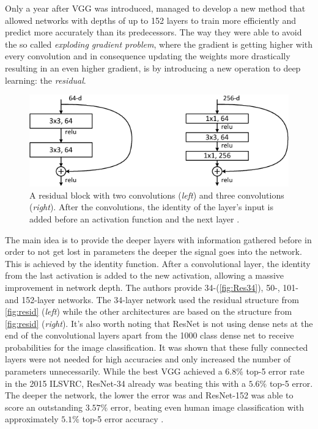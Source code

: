 Only a year after VGG was introduced, \citet{He_2016} managed to develop a new method that allowed networks with depths of up to 152 layers to train more efficiently and predict more accurately than its predecessors. The way they were able to avoid the so called \textit{exploding gradient problem}, where the gradient is getting higher with every convolution and in consequence updating the weights more drastically resulting in an even higher gradient, is by introducing a new operation to deep learning: the \textit{residual}. \\

\begin{figure}[h!]
\centering
\includegraphics[width=.667\textwidth]{images/Chapter2/6-Figure5-1.png}
\caption{A residual block with two convolutions (\textit{left}) and three convolutions (\textit{right}). After the convolutions, the identity of the layer's input is added before an activation function and the next layer \citep{He_2016}.} 
\label{fig:resid}
\end{figure}

The main idea is to provide the deeper layers with information gathered before in order to not get lost in parameters the deeper the signal goes into the network. This is achieved by the identity function. After a convolutional layer, the identity from the last activation is added to the new activation,  allowing a massive improvement in network depth. The authors provide 34-(\autoref{fig:Res34}), 50-, 101- and 152-layer networks. The 34-layer network used the residual structure from \autoref{fig:resid} (\textit{left}) while the other architectures are based on the structure from \autoref{fig:resid} (\textit{right}). It's also worth noting that ResNet is not using dense nets at the end of the convolutional layers apart from the 1000 class dense net to receive probabilities for the image classification. It was shown that these fully connected layers were not needed for high accuracies and only increased the number of parameters unnecessarily. While the best VGG achieved a $6.8\%$ top-5 error rate in the 2015 ILSVRC, ResNet-34 already was beating this with a $5.6\%$ top-5 error. The deeper the network, the lower the error was and ResNet-152 was able to score an outstanding $3.57\%$ error, beating even human image classification with approximately $5.1\%$ top-5 error accuracy \citep{russakovsky2015imagenet}.

